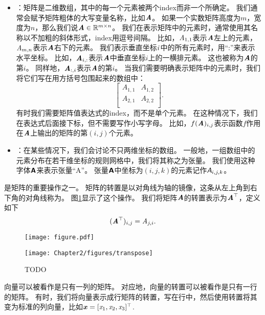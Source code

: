 \begin{itemize}
    \item {}：矩阵是二维数组，其中的每一个元素被两个\gls{index}而非一个所确定。
    我们通常会赋予矩阵粗体的大写变量名称，比如$\boldsymbol{\mathit{A}}$。
    如果一个实数矩阵高度为$m$，宽度为$n$，那么我们说$\boldsymbol{\mathit{A}}\in \mathbb{R}^{m\times n}$。
    我们在表示矩阵中的元素时，通常使用其名称以不加粗的斜体形式，\gls{index}用逗号间隔。
    比如，$\mathit{A}_{1,1}$表示$\boldsymbol{\mathit{A}}$左上的元素，$\mathit{A}_{m,n}$表示$\boldsymbol{\mathit{A}}$右下的元素。
    我们表示垂直坐标$\mathit{i}$中的所有元素时，用“:”来表示水平坐标。
    比如，$\boldsymbol{\mathit{A}}_{i,:}$表示$\boldsymbol{\mathit{A}}$中垂直坐标$i$上的一横排元素。
    这也被称为$\boldsymbol{\mathit{A}}$的第$i$。
    同样地，$\boldsymbol{\mathit{A}}_{:,i}$表示$\boldsymbol{\mathit{A}}$的第$i$。
    当我们需要明确表示矩阵中的元素时，我们将它们写在用方括号包围起来的数组中：
    \begin{equation}
        \begin{bmatrix}
            A_{1,1} & A_{1,2} \\
            A_{2,1} & A_{2,2} \\
        \end{bmatrix}.
    \end{equation}
    有时我们需要矩阵值表达式的\gls{index}，而不是单个元素。
    在这种情况下，我们在表达式后面接下标，但不需要写作小写字母。
    比如，$f(\boldsymbol{\mathit{A}})_{i,j}$表示函数$f$作用在$\boldsymbol{\mathit{A}}$上输出的矩阵的第$(i,j)$个元素。


    \item {}：在某些情况下，我们会讨论不只两维坐标的数组。
    一般地，一组数组中的元素分布在若干维坐标的规则网格中，我们将其称之为张量。
    我们使用这种字体$\textsf{\textbf{A}}$来表示张量“A”。
    张量$\textsf{\textbf{A}}$中坐标为$(i,j,k)$的元素记作$\textsf{\emph{A}}_{i,j,k}$。
\end{itemize}


是矩阵的重要操作之一。
矩阵的转置是以对角线为轴的镜像，这条从左上角到右下角的对角线称为。
图\ref{fig:chap2_transpose}显示了这个操作。
我们将矩阵$\boldsymbol{\mathit{A}}$的转置表示为$\boldsymbol{\mathit{A}}^\top$，定义如下
\begin{equation}
(\boldsymbol{\mathit{A}}^\top)_{i,j}= \mathit{A}_{j,i}.
\end{equation}

\begin{figure}[!htb]
\ifOpenSource
\centerline{\texttt{[image: figure.pdf]}}
\else
\centerline{\texttt{[image: Chapter2/figures/transpose]}}
\fi
\caption{TODO}
\label{fig:chap2_transpose}
\end{figure}

向量可以被看作是只有一列的矩阵。
对应地，向量的转置可以被看作是只有一行的矩阵。
有时，我们将向量表示成行矩阵的转置，写在行中，然后使用转置将其变为标准的列向量，比如$\boldsymbol{\mathit{x}}=[\mathit{x}_1, \mathit{x}_2, \mathit{x}_3]^\top$.


